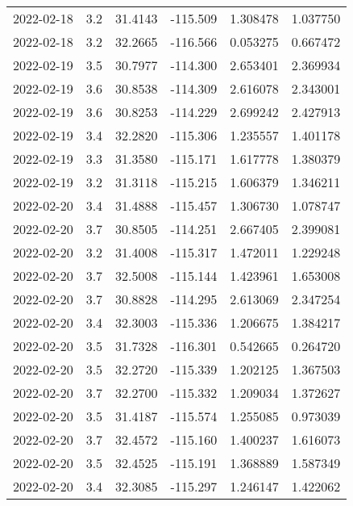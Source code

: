 \begin{tabular}{lrrrrr}
2022-02-18 &       3.2 &  31.4143 &  -115.509 &         1.308478 &         1.037750 \\
2022-02-18 &       3.2 &  32.2665 &  -116.566 &         0.053275 &         0.667472 \\
2022-02-19 &       3.5 &  30.7977 &  -114.300 &         2.653401 &         2.369934 \\
2022-02-19 &       3.6 &  30.8538 &  -114.309 &         2.616078 &         2.343001 \\
2022-02-19 &       3.6 &  30.8253 &  -114.229 &         2.699242 &         2.427913 \\
2022-02-19 &       3.4 &  32.2820 &  -115.306 &         1.235557 &         1.401178 \\
2022-02-19 &       3.3 &  31.3580 &  -115.171 &         1.617778 &         1.380379 \\
2022-02-19 &       3.2 &  31.3118 &  -115.215 &         1.606379 &         1.346211 \\
2022-02-20 &       3.4 &  31.4888 &  -115.457 &         1.306730 &         1.078747 \\
2022-02-20 &       3.7 &  30.8505 &  -114.251 &         2.667405 &         2.399081 \\
2022-02-20 &       3.2 &  31.4008 &  -115.317 &         1.472011 &         1.229248 \\
2022-02-20 &       3.7 &  32.5008 &  -115.144 &         1.423961 &         1.653008 \\
2022-02-20 &       3.7 &  30.8828 &  -114.295 &         2.613069 &         2.347254 \\
2022-02-20 &       3.4 &  32.3003 &  -115.336 &         1.206675 &         1.384217 \\
2022-02-20 &       3.5 &  31.7328 &  -116.301 &         0.542665 &         0.264720 \\
2022-02-20 &       3.5 &  32.2720 &  -115.339 &         1.202125 &         1.367503 \\
2022-02-20 &       3.7 &  32.2700 &  -115.332 &         1.209034 &         1.372627 \\
2022-02-20 &       3.5 &  31.4187 &  -115.574 &         1.255085 &         0.973039 \\
2022-02-20 &       3.7 &  32.4572 &  -115.160 &         1.400237 &         1.616073 \\
2022-02-20 &       3.5 &  32.4525 &  -115.191 &         1.368889 &         1.587349 \\
2022-02-20 &       3.4 &  32.3085 &  -115.297 &         1.246147 &         1.422062 \\

\end{tabular}
